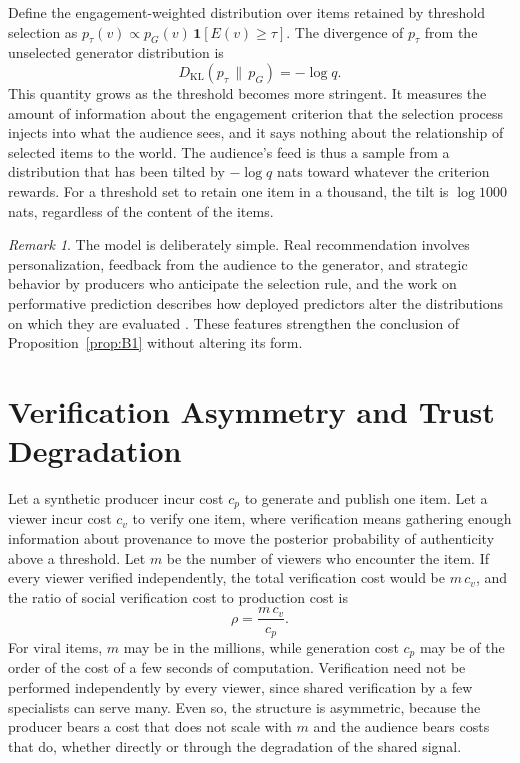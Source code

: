 \documentclass[12pt]{article}
\theoremstyle{plain}
\theoremstyle{definition}
\theoremstyle{remark}
\newtheorem{remark}{Remark}
\begin{document}
Define the engagement-weighted distribution over items retained by threshold selection as $p_\tau(v) \propto p_G(v)\,\mathbf 1[E(v) \ge \tau]$. The divergence of $p_\tau$ from the unselected generator distribution is
\[
D_{\mathrm{KL}}(p_\tau \,\|\, p_G) = -\log q.
\]
This quantity grows as the threshold becomes more stringent. It measures the amount of information about the engagement criterion that the selection process injects into what the audience sees, and it says nothing about the relationship of selected items to the world. The audience's feed is thus a sample from a distribution that has been tilted by $-\log q$ nats toward whatever the criterion rewards. For a threshold set to retain one item in a thousand, the tilt is $\log 1000$ nats, regardless of the content of the items.

\begin{remark}
The model is deliberately simple. Real recommendation involves personalization, feedback from the audience to the generator, and strategic behavior by producers who anticipate the selection rule, and the work on performative prediction describes how deployed predictors alter the distributions on which they are evaluated \cite{perdomo2020}. These features strengthen the conclusion of Proposition~\ref{prop:B1} without altering its form.
\end{remark}

\section{Verification Asymmetry and Trust Degradation}

Let a synthetic producer incur cost $c_p$ to generate and publish one item. Let a viewer incur cost $c_v$ to verify one item, where verification means gathering enough information about provenance to move the posterior probability of authenticity above a threshold. Let $m$ be the number of viewers who encounter the item. If every viewer verified independently, the total verification cost would be $m\,c_v$, and the ratio of social verification cost to production cost is
\[
\rho = \frac{m\, c_v}{c_p}.
\]
For viral items, $m$ may be in the millions, while generation cost $c_p$ may be of the order of the cost of a few seconds of computation. Verification need not be performed independently by every viewer, since shared verification by a few specialists can serve many. Even so, the structure is asymmetric, because the producer bears a cost that does not scale with $m$ and the audience bears costs that do, whether directly or through the degradation of the shared signal.
\end{document}
